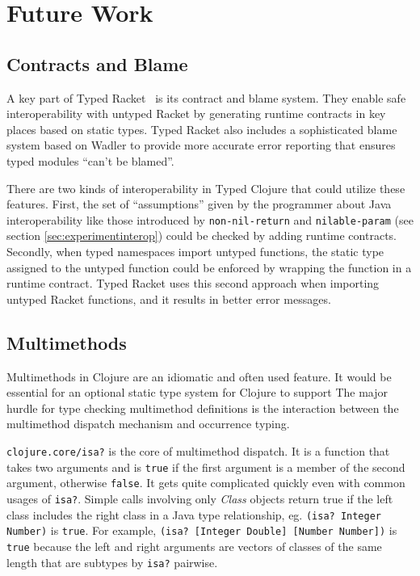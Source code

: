 \chapter{Future Work}

\section{Contracts and Blame}
\label{sec:contractsblame}

A key part of Typed Racket~\cite{Tob10} is its contract and blame system.
They enable safe interoperability with untyped Racket by generating runtime
contracts in key places based on static types. Typed Racket also 
includes a sophisticated blame system based on Wadler\cite{WF09}
to provide more accurate error reporting that ensures typed modules
``can't be blamed''.

There are two kinds of interoperability in Typed Clojure
that could utilize these features. First, the set of ``assumptions''
given by the programmer about Java interoperability like those introduced by \lstinline|non-nil-return| 
and \lstinline|nilable-param| (see section \ref{sec:experimentinterop})
could be checked by adding runtime contracts.
Secondly, when typed namespaces import untyped functions, the static type
assigned to the untyped function could be enforced by wrapping the
function in a runtime contract. Typed Racket uses this second approach
when importing untyped Racket functions, and it results in better error messages.

\section{Multimethods}
\label{sec:mmfuture}

Multimethods in Clojure are an idiomatic and often used feature.
It would be essential for an optional static type system for Clojure to support
The major hurdle for type checking multimethod definitions is the
interaction between the multimethod dispatch mechanism and occurrence typing.

\lstinline|clojure.core/isa?| is the core of multimethod dispatch.
It is a function that takes two arguments and is \lstinline|true| if
the first argument is a member of the second argument, otherwise \lstinline|false|.
It gets quite complicated quickly even with common usages of \lstinline|isa?|.
Simple calls involving only \emph{Class} objects return true if the left class
includes the right class in a Java type relationship, eg. \lstinline|(isa? Integer Number)| is \lstinline|true|.
For example, \lstinline|(isa? [Integer Double] [Number Number])| is \lstinline|true|
because the left and right arguments are vectors of classes of the same length
that are subtypes by \lstinline|isa?| pairwise.

